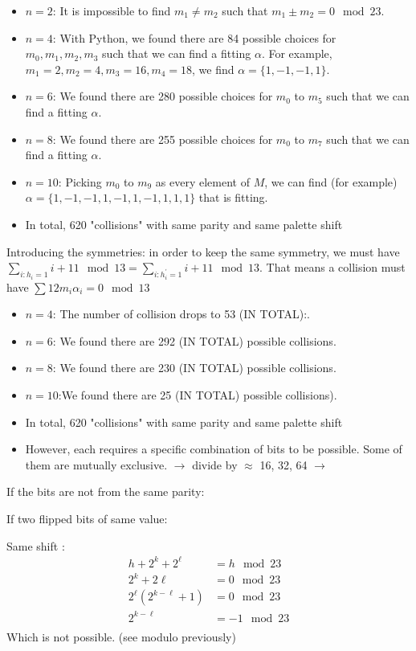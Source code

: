 \documentclass{article}
\begin{document}
\begin{itemize}
	\item $n=2$: It is impossible to find $m_1 \neq m_2$ such that $m_1 \pm m_2 = 0 \mod 23$.
	\item $n=4$: With Python, we found there are 84 possible choices for $m_0, m_1, m_2, m_3$ such that we can find a fitting $\alpha$. For example, $m_1 = 2, m_2 = 4, m_3 = 16, m_4 = 18$, we find $\alpha = \{1, -1, -1,1\}$.
	\item $n=6$: We found there are 280 possible choices for $m_0$ to $m_5$ such that we can find a fitting $\alpha$.
	\item $n=8$: We found there are 255 possible choices for $m_0$ to $m_7$ such that we can find a fitting $\alpha$.
	\item $n=10$: Picking $m_0$ to $m_9$ as every element of $M$, we can find (for example) $\alpha = \{1, -1, -1, 1,-1,1,-1,1,1,1\}$ that is fitting.
	\item In total, 620 "collisions" with same parity and same palette shift
\end{itemize}
Introducing the symmetries: in order to keep the same symmetry, we must have $\sum\limits_{i : h_i =1}i + 11 \mod 13 = \sum\limits_{i : h^\prime_i =1}i + 11 \mod 13$. That means a collision must have $\sum 12m_i\alpha_i = 0\mod 13$
\begin{itemize}
	\item $n=4$: The number of collision drops to 53 (IN TOTAL):.
	\item $n=6$: We found there are 292 (IN TOTAL) possible collisions.
	\item $n=8$: We found there are 230 (IN TOTAL) possible collisions.
	\item $n=10$:We found there are 25 (IN TOTAL) possible collisions).
	\item In total, 620 "collisions" with same parity and same palette shift
	\item However, each requires a specific combination of bits to be possible. Some of them are mutually exclusive. $\rightarrow$ divide by $\approx$ 16, 32, 64 $\rightarrow$  
\end{itemize}

If the bits are not from the same parity:

If two flipped bits of same value:

Same shift : 
\begin{align*}
	h + 2^k + 2^\ell &= h \mod 23 \\
	2^k + 2\ell &= 0 \mod 23\\
	2^\ell( 2^{k-\ell} + 1) &= 0 \mod 23\\
 	2^{k-\ell} &= -1 \mod 23\\
\end{align*}
Which is not possible. (see modulo previously)
\end{document}
